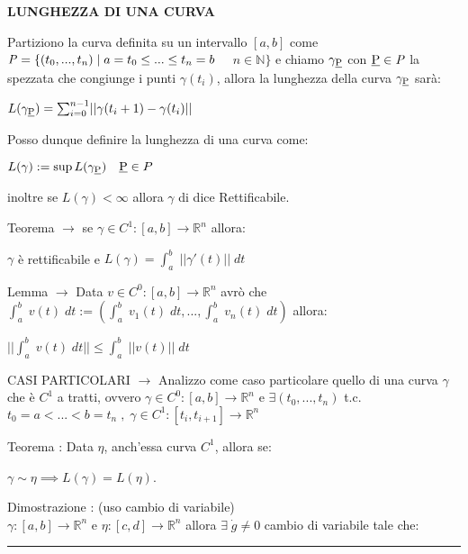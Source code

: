 \documentclass[8pt]{extarticle}
\newenvironment{formulario}
{
\setlength{\columnsep}{3em}
\twocolumn
\lstset{tabsize=3}
\begin{spacing}{1}
\begin{flushleft}
}{
\end{flushleft}
\end{spacing}
}
\newenvironment{tcenter}{
  \par
  \centering
  \setlength{\parskip}{0pt} %
  \noindent
}{
  \par
}
\newenvironment{Descr}
{
	\begin{description}[topsep=0pt,itemsep=0pt,partopsep=0pt, parsep=0pt]
}{
	\end{description}
}
\newenvironment{myParagraph}[1]
{
\begin{tcenter}
\textbf{#1}
\end{tcenter}
}{
\myRule
}
\newcommand{\norma}[1]{\lvert\lvert #1\rvert\rvert}
\newcommand{\R}{\mathbb{R}}
\newcommand{\N}{\mathbb{N}}
\newcommand{\myRule}{\rule{250pt}{0.1pt}}
\newcommand{\ra}{\rightarrow}
\begin{document}
\begin{formulario}
		\begin{myParagraph}{LUNGHEZZA DI UNA CURVA}
Partiziono la curva definita su un intervallo $[a,b]$ come $\text{\textit{P}}=\{(t_0,...,t_n) \;|\; a=t_0 \leq ... \leq t_n=b$ $\quad n\in\N\}$ e chiamo $\gamma_{\text{\underline{P}}}$ con $\text{\underline{P}} \in \text{\textit{P}}$ la spezzata che congiunge i punti $\gamma(t_i)$, allora la lunghezza della curva $\gamma_{\text{\underline{P}}}$ sarà:\\
			\begin{tcenter}
					$L(\gamma_{\text{\underline{P}}})=\sum_{i=0}^{n-1} \norma{\gamma(t_i+1)-\gamma(t_i)}$
			\end{tcenter}
				Posso dunque definire la lunghezza di una curva come:
			\begin{tcenter}
					$L(\gamma):=\sup L(\gamma_{\text{\underline{P}}})\quad\text{\underline{P}}\in P$
			\end{tcenter}
				inoltre se $L(\gamma)<\infty$ allora $\gamma$ di dice Rettificabile.
			\begin{Descr}
				\item[Teorema] $\ra$ se $\gamma\in C^1 :[a,b]\to\R^n$ allora:
				\begin{tcenter}
					$\gamma$ è rettificabile e $L(\gamma)=\int_a^b \; \norma{\gamma'(t)} \; dt$
				\end{tcenter}
				\item[Lemma] $\ra$ Data $v\in C^0:[a,b]\to\R^n$ avrò che $\int_a^b \; v(t)\; dt:=\left(\int_a^b \; v_1(t)\; dt,...,\int_a^b \; v_n(t)\; dt\right)$ allora:
				\begin{tcenter}
					$\norma{\int_a^b \; v(t)\; dt}\leq \int_a^b \; \norma{v(t)}\; dt$
				\end{tcenter}
				\item[CASI PARTICOLARI] $\ra$ Analizzo come caso particolare quello di una curva $\gamma$ che è $C^1$ a tratti, ovvero $\gamma\in C^0:[a,b]\to\R^n$ e $\exists (t_0,...,t_n)$ t.c. $t_0=a<...<b=t_n \; , \; \gamma\in C^1:[t_i,t_{i+1}]\to\R^n$
				\begin{Descr}
					\item[Teorema]: Data $\eta$, anch'essa curva $C^1$, allora se: 
					\begin{tcenter}
						$\gamma\sim\eta \implies L(\gamma)= L(\eta)$.
					\end{tcenter}
					\item[Dimostrazione]: (uso cambio di variabile)\\
					$\gamma:[a,b]\to\R^n$ e $\eta:[c,d]\to\R^n$ allora $\exists\; \dot{g}\neq 0$ cambio di variabile tale che:\\

\end{Descr}
\end{Descr}
\end{myParagraph}
\end{formulario}
\end{document}
